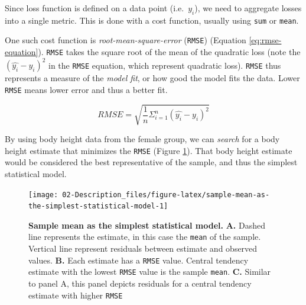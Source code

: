 \documentclass[
]{book}
\begin{document}
Since loss function is defined on a data point (i.e.~\(y_i\)), we need to aggregate losses into a single metric. This is done with a cost function, usually using \texttt{sum} or \texttt{mean}.

One such cost function is \emph{root-mean-square-error} (\texttt{RMSE}) (Equation \eqref{eq:rmse-equation}). \texttt{RMSE} takes the square root of the mean of the quadratic loss (note the \((\hat{y_i} - y_i)^2\) in the \texttt{RMSE} equation, which represent quadratic loss). \texttt{RMSE} thus represents a measure of the \emph{model fit}, or how good the model fits the data. Lower \texttt{RMSE} means lower error and thus a better fit.

\begin{equation}
  RMSE = \sqrt{\frac{1}{n}\Sigma_{i=1}^{n}(\hat{y_i} - y_i)^2}
  \label{eq:rmse-equation}
\end{equation}

By using body height data from the female group, we can \emph{search} for a body height estimate that minimizes the \texttt{RMSE} (Figure \ref{fig:sample-mean-as-the-simplest-statistical-model}). That body height estimate would be considered the best representative of the sample, and thus the simplest statistical model.

\begin{figure}

{\centering \texttt{[image: 02-Description\_files/figure-latex/sample-mean-as-the-simplest-statistical-model-1]} 

}

\caption{\textbf{Sample mean as the simplest statistical model.} \textbf{A.} Dashed line represents the estimate, in this case the \texttt{mean} of the sample. Vertical line represent residuals between estimate and observed values. \textbf{B.} Each estimate has a \texttt{RMSE} value. Central tendency estimate with the lowest \texttt{RMSE} value is the sample \texttt{mean}. \textbf{C.} Similar to panel A, this panel depicts residuals for a central tendency estimate with higher \texttt{RMSE}}\label{fig:sample-mean-as-the-simplest-statistical-model}
\end{figure}
\end{document}

